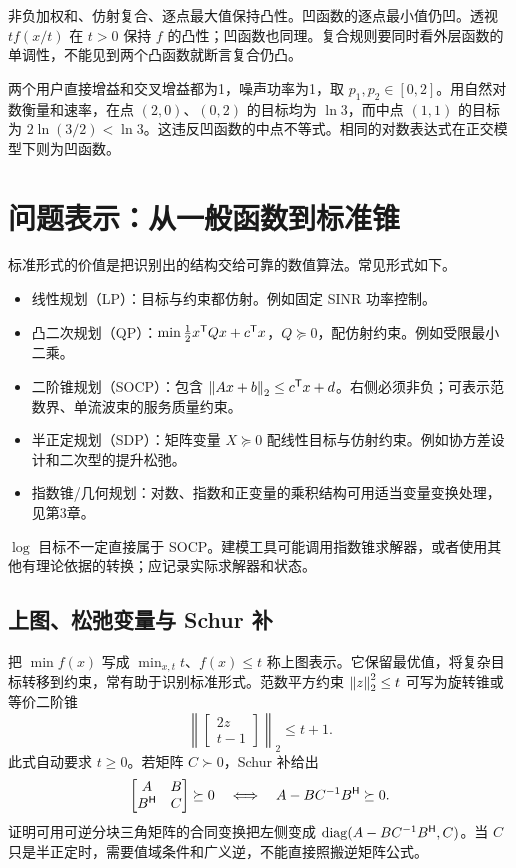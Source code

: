 非负加权和、仿射复合、逐点最大值保持凸性。凹函数的逐点最小值仍凹。透视 $t f(x/t)$ 在 $t>0$ 保持 $f$ 的凸性；凹函数也同理。复合规则要同时看外层函数的单调性，不能见到两个凸函数就断言复合仍凸。

\begin{example}[干扰和速率为何可能非凹]
两个用户直接增益和交叉增益都为1，噪声功率为1，取 $p_1,p_2\in[0,2]$。用自然对数衡量和速率，在点 $(2,0)$、$(0,2)$ 的目标均为 $\ln3$，而中点 $(1,1)$ 的目标为 $2\ln(3/2)<\ln3$。这违反凹函数的中点不等式。相同的对数表达式在正交模型下则为凹函数。
\end{example}

\section{问题表示：从一般函数到标准锥}
标准形式的价值是把识别出的结构交给可靠的数值算法\cite{boyd2004}。常见形式如下。
\begin{itemize}
\item 线性规划（LP）：目标与约束都仿射。例如固定 SINR 功率控制。
\item 凸二次规划（QP）：$\min \tfrac12x^{\mathsf T}Qx+c^{\mathsf T}x$，$Q\succeq0$，配仿射约束。例如受限最小二乘。
\item 二阶锥规划（SOCP）：包含 $\left\lVert Ax+b\right\rVert_2\le c^{\mathsf T}x+d$。右侧必须非负；可表示范数界、单流波束的服务质量约束。
\item 半正定规划（SDP）：矩阵变量 $X\succeq0$ 配线性目标与仿射约束。例如协方差设计和二次型的提升松弛。
\item 指数锥/几何规划：对数、指数和正变量的乘积结构可用适当变量变换处理，见第3章。
\end{itemize}
$\log$ 目标不一定直接属于 SOCP。建模工具可能调用指数锥求解器，或者使用其他有理论依据的转换；应记录实际求解器和状态。

\subsection{上图、松弛变量与 Schur 补}
把 $\min f(x)$ 写成 $\min_{x,t}t$、$f(x)\le t$ 称上图表示。它保留最优值，将复杂目标转移到约束，常有助于识别标准形式。范数平方约束 $\left\lVert z\right\rVert_2^2\le t$ 可写为旋转锥或等价二阶锥
\begin{equation}
 \left\|\begin{bmatrix}2z\\t-1\end{bmatrix}\right\|_2\le t+1.
\end{equation}
此式自动要求 $t\ge0$。若矩阵 $C\succ0$，Schur 补给出
\begin{equation}\label{eq:schur}
 \begin{bmatrix}A&B\\B^{\mathsf H}&C\end{bmatrix}\succeq0
 \quad\Longleftrightarrow\quad A-BC^{-1}B^{\mathsf H}\succeq0.
\end{equation}
证明可用可逆分块三角矩阵的合同变换把左侧变成 $\operatorname{diag}(A-BC^{-1}B^{\mathsf H},C)$。当 $C$ 只是半正定时，需要值域条件和广义逆，不能直接照搬逆矩阵公式。

